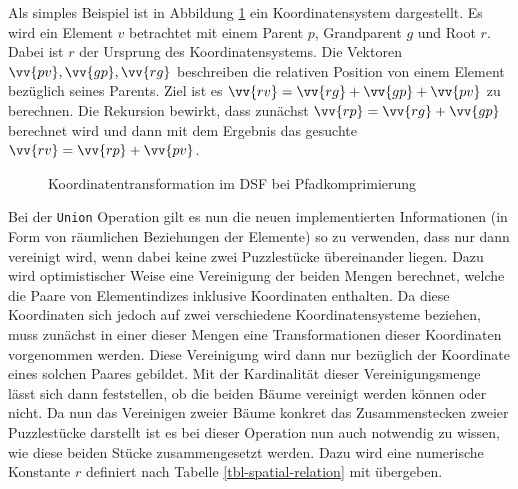 \documentclass{whswinvcbook}
\begin{document}
Als simples Beispiel ist in Abbildung \ref{fig-dsf-vec} ein Koordinatensystem dargestellt. Es wird ein Element $v$ betrachtet mit einem Parent $p$, Grandparent $g$ und Root $r$. Dabei ist $r$ der Ursprung des Koordinatensystems. Die Vektoren $\vv{pv},\vv{gp},\vv{rg}$ beschreiben die relativen Position von einem Element bezüglich seines Parents. Ziel ist es $\vv{rv}=\vv{rg}+\vv{gp}+\vv{pv}$ zu berechnen. Die Rekursion bewirkt, dass zunächst $\vv{rp}=\vv{rg}+\vv{gp}$ berechnet wird und dann mit dem Ergebnis das gesuchte $\vv{rv}=\vv{rp}+\vv{pv}$.
\begin{figure}[H]
    \centering
    \caption{Koordinatentransformation im DSF bei Pfadkomprimierung}
    \label{fig-dsf-vec}
\end{figure}
Bei der \texttt{Union} Operation gilt es nun die neuen implementierten Informationen (in Form von räumlichen Beziehungen der Elemente) so zu verwenden, dass nur dann vereinigt wird, wenn dabei keine zwei Puzzlestücke übereinander liegen. Dazu wird optimistischer Weise eine Vereinigung der beiden Mengen berechnet, welche die Paare von Elementindizes inklusive Koordinaten enthalten. Da diese Koordinaten sich jedoch auf zwei verschiedene Koordinatensysteme beziehen, muss zunächst in einer dieser Mengen eine Transformationen dieser Koordinaten vorgenommen werden. Diese Vereinigung wird dann nur bezüglich der Koordinate eines solchen Paares gebildet. Mit der Kardinalität dieser Vereinigungsmenge lässt sich dann feststellen, ob die beiden Bäume vereinigt werden können oder nicht. Da nun das Vereinigen zweier Bäume konkret das Zusammenstecken zweier Puzzlestücke darstellt ist es bei dieser Operation nun auch notwendig zu wissen, wie diese beiden Stücke zusammengesetzt werden. Dazu wird eine numerische Konstante $r$ definiert nach Tabelle \ref{tbl-spatial-relation} mit übergeben.
\end{document}
